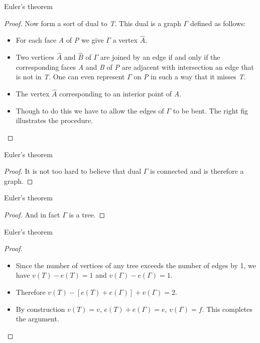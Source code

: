 \documentclass{beamer}
\begin{document}
\begin{frame}{Euler's theorem}
  \begin{proof}
    Now form a sort of dual to \textsl{T}. This dual is a graph $\Gamma$ defined as follows:
    \begin{itemize}
    \item For each face \textsl{A} of \textsl{P} we give $\Gamma$ a vertex $\hat A$.
    \item Two vertices $\hat A$ and $\hat B$ of $\Gamma$ are joined by an edge if and only if the corresponding faces \textsl{A} and \textsl{B} of \textsl{P} are adjacent with intersection an edge that is not in \textsl{T}. One can even represent $\Gamma$ on \textsl{P} in such a way that it misses \textsl{T}.
    \item The vertex $\hat A$ corresponding to an interior point of \textsl{A}.
    \item Though to do this we have to allow the edges of $\Gamma$ to be bent. The right fig illustrates the procedure.
    \end{itemize}
  \end{proof}
\end{frame}

\begin{frame}{Euler's theorem}
  \begin{proof}
    It is not too hard to believe that dual $\Gamma$ is connected and is therefore a graph.
  \end{proof}
\end{frame}

\begin{frame}{Euler's theorem}
  \begin{proof}
    And in fact $\Gamma$ is a tree.
  \end{proof}
\end{frame}

\begin{frame}{Euler's theorem}
      \begin{proof}
        \begin{itemize}
        \item Since the number of vertices of any tree exceeds the number of edges by 1, we have $v(T) - e(T) = 1$ and $v(\Gamma) - e(\Gamma) = 1$.
        \item Therefore $v(T) - [e(T) + e(\Gamma)] + v(\Gamma) = 2$.
        \item By construction $v(T) = v$, $e(T) + e(\Gamma) = e$, $v(\Gamma) = f$. This completes the argument.
        \end{itemize}
      \end{proof}
\end{frame}
\end{document}
